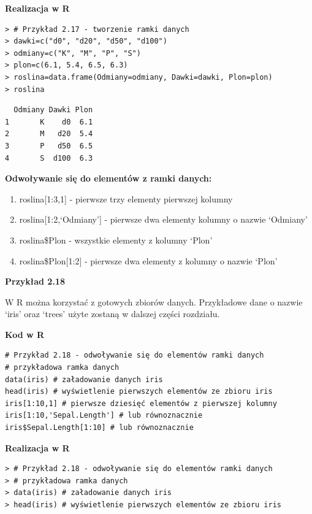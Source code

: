 \documentclass[12pt,B5paper,]{book}
\begin{document}
\newpage

\textbf{Realizacja w R}

\begin{verbatim}
> # Przykład 2.17 - tworzenie ramki danych
> dawki=c("d0", "d20", "d50", "d100")
> odmiany=c("K", "M", "P", "S")
> plon=c(6.1, 5.4, 6.5, 6.3)
> roslina=data.frame(Odmiany=odmiany, Dawki=dawki, Plon=plon)
> roslina
\end{verbatim}

\begin{verbatim}
  Odmiany Dawki Plon
1       K    d0  6.1
2       M   d20  5.4
3       P   d50  6.5
4       S  d100  6.3
\end{verbatim}

\vspace{0.8cm}

\textbf{Odwoływanie się do elementów z ramki danych:}

\begin{enumerate}
\def\labelenumi{\alph{enumi})}
\item
  roslina{[}1:3,1{]} - pierwsze trzy elementy pierwszej kolumny
\item
  roslina{[}1:2,`Odmiany'{]} - pierwsze dwa elementy kolumny o nazwie
  `Odmiany'
\item
  roslina\$Plon - wszystkie elementy z kolumny `Plon'
\item
  roslina\$Plon{[}1:2{]} - pierwsze dwa elementy z kolumny o nazwie
  `Plon'
\end{enumerate}

\vspace{0.4cm} \textbf{Przykład 2.18}

W R można korzystać z gotowych zbiorów danych. Przykładowe dane o nazwie
`iris' oraz `trees' użyte zostaną w dalszej części rozdziału.

\textbf{Kod w R}

\begin{verbatim}
# Przykład 2.18 - odwoływanie się do elementów ramki danych
# przykładowa ramka danych
data(iris) # załadowanie danych iris
head(iris) # wyświetlenie pierwszych elementów ze zbioru iris
iris[1:10,1] # pierwsze dziesięć elementów z pierwszej kolumny
iris[1:10,'Sepal.Length'] # lub równoznacznie
iris$Sepal.Length[1:10] # lub równoznacznie
\end{verbatim}

\vspace{0.8cm} \textbf{Realizacja w R}

\begin{verbatim}
> # Przykład 2.18 - odwoływanie się do elementów ramki danych
> # przykładowa ramka danych
> data(iris) # załadowanie danych iris
> head(iris) # wyświetlenie pierwszych elementów ze zbioru iris
\end{verbatim}
\end{document}
